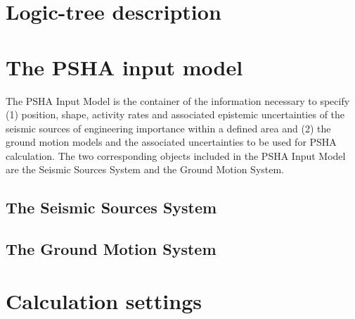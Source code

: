 \section{Logic-tree description}
\label{hazard:logic_tree}

%
\section{The PSHA input model}
\label{hazard:pshainputmodel}
The PSHA Input Model is the container of the information necessary to specify 
(1) position, shape, activity rates and associated epistemic uncertainties
of the seismic sources of engineering importance within a defined area and (2) 
the ground motion models and the associated uncertainties to be used for PSHA
calculation.
% 
The two corresponding objects included in the PSHA Input Model are the 
Seismic Sources System and the Ground Motion System.
\subsection{The Seismic Sources System}

\subsection{The Ground Motion System}

%
\section{Calculation settings}
\label{hazard:calculation_settings}







